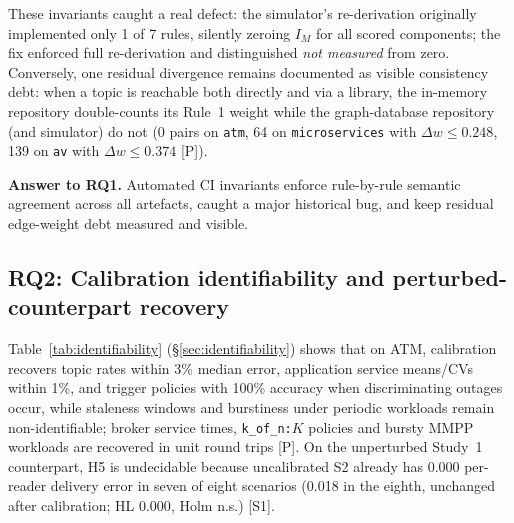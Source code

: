 These invariants caught a real defect: the simulator's re-derivation originally implemented only 1 of 7 rules, silently zeroing $I_M$ for all scored components; the fix enforced full re-derivation and distinguished \emph{not measured} from zero. Conversely, one residual divergence remains documented as visible consistency debt: when a topic is reachable both directly and via a library, the in-memory repository double-counts its Rule~1 weight while the graph-database repository (and simulator) do not (0 pairs on \texttt{atm}, 64 on \texttt{microservices} with $\Delta w \le 0.248$, 139 on \texttt{av} with $\Delta w \le 0.374$ [P]).

\textbf{Answer to RQ1.} Automated CI invariants enforce rule-by-rule semantic agreement across all artefacts, caught a major historical bug, and keep residual edge-weight debt measured and visible.

\subsection{RQ2: Calibration identifiability and perturbed-counterpart recovery}

Table~\ref{tab:identifiability} (\S\ref{sec:identifiability}) shows that on ATM, calibration recovers topic rates within 3\% median error, application service means/CVs within 1\%, and trigger policies with 100\% accuracy when discriminating outages occur, while staleness windows and burstiness under periodic workloads remain non-identifiable; broker service times, \texttt{k\_of\_n:$K$} policies and bursty MMPP workloads are recovered in unit round trips [P]. On the unperturbed Study~1 counterpart, H5 is undecidable because uncalibrated S2 already has 0.000 per-reader delivery error in seven of eight scenarios (0.018 in the eighth, unchanged after calibration; HL $0.000$, Holm n.s.) [S1].

